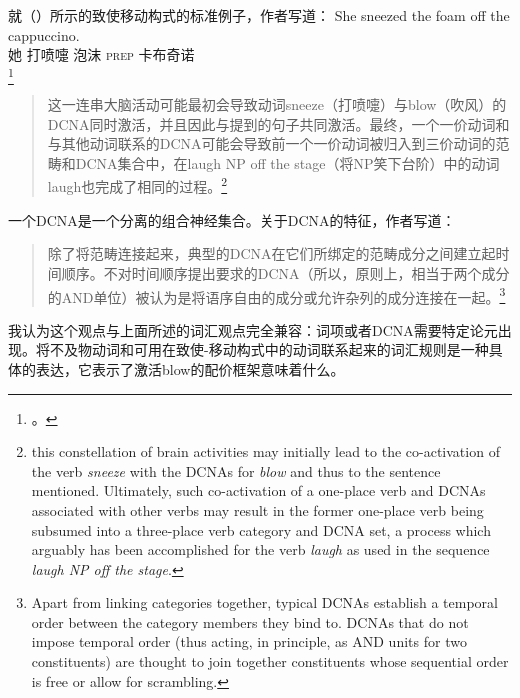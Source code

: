 \begin{exe}
\begin{xlist}[iv.]
\begin{exe}
\begin{xlist}[iv.]
就（）所示的致使移动构式的标准例子，作者写道：
\ea
\gll She sneezed the foam off the cappuccino.\\
     她 打喷嚏  泡沫 \textsc{prep}  卡布奇诺\\
\footnote{%
 。
}
\z
\begin{quotation}
  这一连串大脑活动可能最初会导致动词sneeze（打喷嚏）与blow（吹风）的DCNA同时激活，并且因此与提到的句子共同激活。最终，一个一价动词和与其他动词联系的DCNA可能会导致前一个一价动词被归入到三价动词的范畴和DCNA集合中，在laugh NP off the stage（将NP笑下台阶）中的动词laugh也完成了相同的过程。\citep*{PCShandbookCxG}\footnote{%
  this constellation of brain activities may initially lead to the co-activation of the verb \emph{sneeze}
  with the DCNAs for \emph{blow} and thus to the sentence mentioned. Ultimately, such co-activation of a
  one-place verb and DCNAs associated with other verbs may result in the former one-place verb being
  subsumed into a three-place verb category and DCNA set, a process which arguably has been
  accomplished for the verb \emph{laugh} as used in the sequence \emph{laugh NP off the stage}. 
  }
\end{quotation}
一个DCNA是一个分离的组合神经集合。关于DCNA的特征，作者写道：
\begin{quotation}
除了将范畴连接起来，典型的DCNA在它们所绑定的范畴成分之间建立起时间顺序。不对时间顺序提出要求的DCNA（所以，原则上，相当于两个成分的AND单位）被认为是将语序自由的成分或允许杂列的成分连接在一起。\citep*[]{PCShandbookCxG}\footnote{%
Apart from linking categories together, typical DCNAs establish a temporal order between the
category members they bind to. DCNAs that do not impose temporal order (thus acting, in principle,
as AND units for two constituents) are thought to join together constituents whose sequential order
is free or allow for scrambling.
}
\end{quotation}
我认为这个观点与上面所述的词汇观点完全兼容：词项或者DCNA需要特定论元出现。将不及物动词和可用在致使-移动构式中的动词联系起来的词汇规则是一种具体的表达，它表示了激活blow的配价框架意味着什么。


\end{xlist}
\end{exe}
\end{xlist}
\end{exe}
